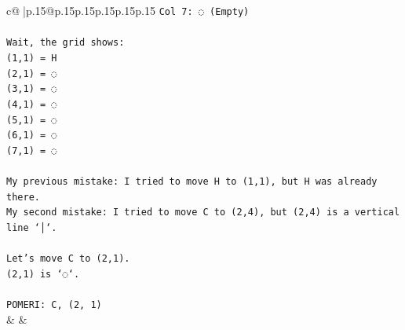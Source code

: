 \documentclass{article}
\begin{document}
{\begin{supertabular}{c@{$\;$}|p{.15\linewidth}@{}p{.15\linewidth}p{.15\linewidth}p{.15\linewidth}p{.15\linewidth}p{.15\linewidth}}
{{{\texttt{Col 7: ◌ (Empty)} \\
\\ 
\texttt{Wait, the grid shows:} \\
\texttt{(1,1) = H} \\
\texttt{(2,1) = ◌} \\
\texttt{(3,1) = ◌} \\
\texttt{(4,1) = ◌} \\
\texttt{(5,1) = ◌} \\
\texttt{(6,1) = ◌} \\
\texttt{(7,1) = ◌} \\
\\ 
\texttt{My previous mistake: I tried to move H to (1,1), but H was already there.} \\
\texttt{My second mistake: I tried to move C to (2,4), but (2,4) is a vertical line `│`.} \\
\\ 
\texttt{Let's move C to (2,1).} \\
\texttt{(2,1) is `◌`.} \\
\\ 
\texttt{POMERI: C, (2, 1)} \\
            }
        }
    }
    & & \\ \\


\end{supertabular}}
\end{document}

